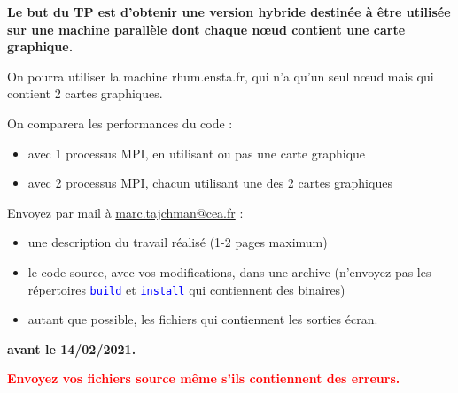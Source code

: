\documentclass{beamer}
\begin{document}
\begin{frame}
\medskip
  
\textbf{Le but du TP est d'obtenir une version hybride destinée à être utilisée sur une machine parallèle dont chaque n\oe ud contient une carte graphique.}
  
\medskip

  On pourra utiliser la machine rhum.ensta.fr, qui n'a qu'un seul n\oe ud mais qui contient 2 cartes graphiques.
  
  On comparera les performances du code :
  \begin{itemize}
  	\item avec 1 processus MPI, en utilisant ou pas une carte graphique 
  	\item avec 2 processus MPI, chacun utilisant une des 2 cartes graphiques 
  \end{itemize}
  
   
\vfill
\end{frame}


\begin{frame}

\bigskip
Envoyez par mail à \href{mailto:marc.tajchman@cea.fr}{marc.tajchman@cea.fr} :

\begin{itemize}
	\item une description du travail réalisé (1-2 pages maximum)
	\item le code source, avec vos modifications, dans une archive
	(n'envoyez pas les répertoires \textcolor{blue}{\tt build} et  \textcolor{blue}{\tt install} qui contiennent des binaires) 
	\item autant que possible, les fichiers qui contiennent les sorties écran.
\end{itemize}

\bigskip

{\bf avant le 14/02/2021.}

\bigskip
\textcolor{red}{\bf Envoyez vos fichiers source même s'ils contiennent des erreurs.}
\end{frame}
\end{document}
